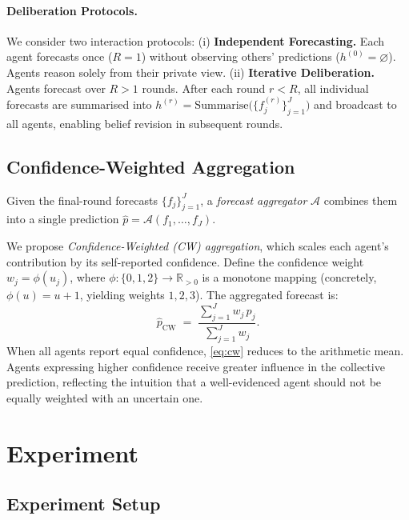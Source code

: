 \documentclass[11pt]{article}
\theoremstyle{definition}          %
\begin{document}
\paragraph{Deliberation Protocols.}
We consider two interaction protocols: (i) \textbf{Independent Forecasting.} Each agent forecasts once ($R=1$) without observing others' predictions ($h^{(0)} = \varnothing$). Agents reason solely from their private view. (ii) \textbf{Iterative Deliberation.} Agents forecast over $R > 1$ rounds. After each round $r < R$, all individual forecasts are summarised into $h^{(r)} = \mathrm{Summarise}\!\bigl(\{f_j^{(r)}\}_{j=1}^{J}\bigr)$ and broadcast to all agents, enabling belief revision in subsequent rounds.

\subsection{Confidence-Weighted Aggregation}

Given the final-round forecasts $\{f_j\}_{j=1}^{J}$, a \emph{forecast aggregator}
$\mathcal{A}$ combines them into a single prediction $\hat{p} = \mathcal{A}(f_1, \dots, f_J)$.

We propose \emph{Confidence-Weighted (CW) aggregation}, which scales each agent's
contribution by its self-reported confidence.
Define the confidence weight $w_j = \phi(u_j)$, where
$\phi : \{0,1,2\} \to \mathbb{R}_{>0}$ is a monotone mapping
(concretely, $\phi(u) = u + 1$, yielding weights $1, 2, 3$).
The aggregated forecast is:
\begin{equation}
  \hat{p}_{\mathrm{CW}} \;=\; \frac{\displaystyle\sum_{j=1}^{J} w_j \, p_j}
                                    {\displaystyle\sum_{j=1}^{J} w_j}.
  \label{eq:cw}
\end{equation}
When all agents report equal confidence, \eqref{eq:cw} reduces to the arithmetic mean.
Agents expressing higher confidence receive greater influence in the collective prediction,
reflecting the intuition that a well-evidenced agent should not be equally weighted with
an uncertain one.

\section{Experiment}
\subsection{Experiment Setup}
\end{document}
